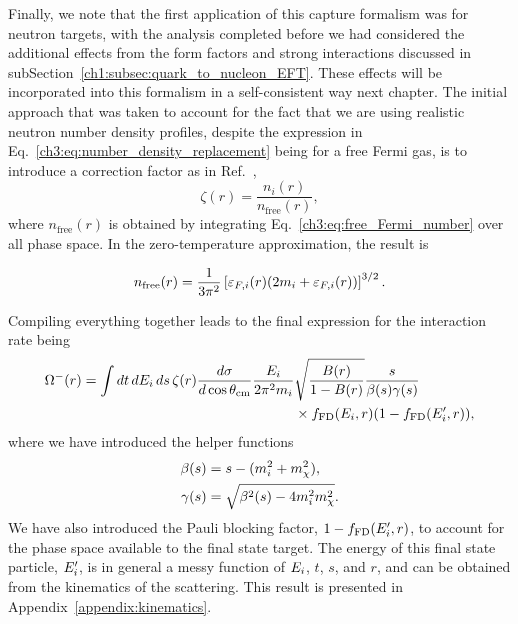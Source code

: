 Finally, we note that the first application of this capture formalism was for neutron targets, with the analysis completed before we had considered the additional effects from the form factors and strong interactions discussed in subSection~\ref{ch1:subsec:quark_to_nucleon_EFT}. These effects will be incorporated into this formalism in a self-consistent way next chapter. The initial approach that was taken to account for the fact that we are using realistic neutron number density profiles, despite the expression in Eq.~\ref{ch3:eq:number_density_replacement} being for a free Fermi gas, is to introduce a correction factor as in Ref.~\cite{Garani:2018kkd_may_NewAnalysisNeutron},
\begin{equation}
    \zeta(r) = \frac{n_i(r)}{n_\mathrm{free}(r)},
\end{equation}
where $n_\mathrm{free}(r)$ is obtained by integrating Eq.~\ref{ch3:eq:free_Fermi_number} over all phase space. In the zero-temperature approximation, the result is

\begin{equation}
    n_\mathrm{free}(r) = \frac{1}{3\pi^2}\left[ \varepsilon_{F,i}(r)(2m_i + \varepsilon_{F,i}(r))\right]^{3/2}.
    \label{ch3:eq:n_free_Fermi}
\end{equation}

Compiling everything together leads to the final expression for the interaction rate being
\begin{equation}
    \begin{split}
        \Omega^-(r) = \int dt\,dE_i\,ds\,\zeta(r) \frac{d\sigma}{d\cos\theta_\mathrm{cm}}\frac{E_i}{2\pi^2 m_i}&\sqrt{\frac{B(r)}{1 - B(r)}} \frac{s}{\beta(s)\gamma(s)}\\
        &\times f_{\rm FD}(E_i, r)(1 - f_{\rm FD}(E_i', r)),
    \end{split}
    \label{ch3:eq:int_rate_capture_full}
\end{equation}
where we have introduced the helper functions
\begin{align}
    \beta(s) & = s - (m_i^2 + m_\chi^2), \label{ch3:eq:beta_func}\\
    \gamma(s) & = \sqrt{\beta^2(s) - 4 m_i^2 m_\chi^2}.\label{ch3:eq:gamma_func}
\end{align}
We have also introduced the Pauli blocking factor, $1 - f_{\rm FD}(E_i', r)$, to account for the phase space available to the final state target. The energy of this final state particle, $E_i'$, is in general a messy function of $E_i$, $t$, $s$, and $r$, and can be obtained from the kinematics of the scattering. This result is presented in Appendix~\ref{appendix:kinematics}.

